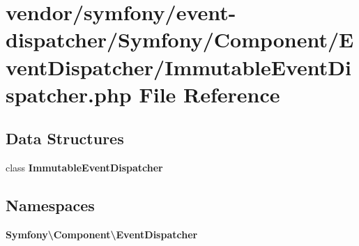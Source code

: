 \section{vendor/symfony/event-\/dispatcher/\+Symfony/\+Component/\+Event\+Dispatcher/\+Immutable\+Event\+Dispatcher.php File Reference}
\label{_immutable_event_dispatcher_8php}
\subsection*{Data Structures}
\begin{DoxyCompactItemize}
\item 
class {\bf Immutable\+Event\+Dispatcher}
\end{DoxyCompactItemize}
\subsection*{Namespaces}
\begin{DoxyCompactItemize}
\item 
 {\bf Symfony\textbackslash{}\+Component\textbackslash{}\+Event\+Dispatcher}
\end{DoxyCompactItemize}
